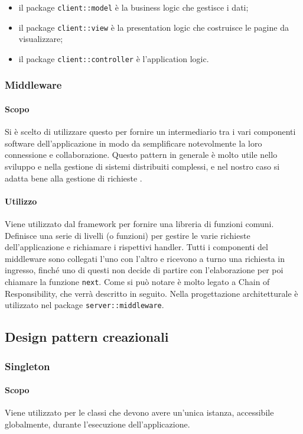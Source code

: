\documentclass[12pt,a4paper]{article}
\begin{document}
\begin{itemize}
	\item il package \texttt{client::model} è la business logic che gestisce i dati;
	\item il package \texttt{client::view} è la presentation logic che costruisce le pagine da visualizzare;
	\item il package \texttt{client::controller} è l'application logic.
\end{itemize}

\subsubsection{Middleware}
\paragraph{Scopo}
Si è scelto di utilizzare questo  per fornire un intermediario tra i vari componenti software dell’applicazione in modo da semplificare notevolmente la loro connessione e collaborazione. Questo pattern in generale è molto utile nello sviluppo e nella gestione di sistemi distribuiti complessi, e nel nostro caso si adatta bene alla gestione di richieste .
\paragraph{Utilizzo}
Viene utilizzato dal framework  per fornire una libreria di funzioni comuni. Definisce una serie di livelli (o funzioni) per gestire le varie richieste dell’applicazione e richiamare i rispettivi handler. Tutti i componenti del middleware sono collegati l’uno con l’altro e ricevono a turno una richiesta in ingresso, finché uno di questi non decide di partire con l’elaborazione per poi chiamare la funzione \texttt{next}. Come si può notare è molto legato a Chain of Responsibility, che verrà descritto in seguito. Nella progettazione architetturale è utilizzato nel package \texttt{server::middleware}.

\subsection{Design pattern creazionali}

\subsubsection{Singleton}
\paragraph{Scopo}
Viene utilizzato per le classi che devono avere un’unica istanza, accessibile globalmente, durante l’esecuzione dell’applicazione.
\end{document}
